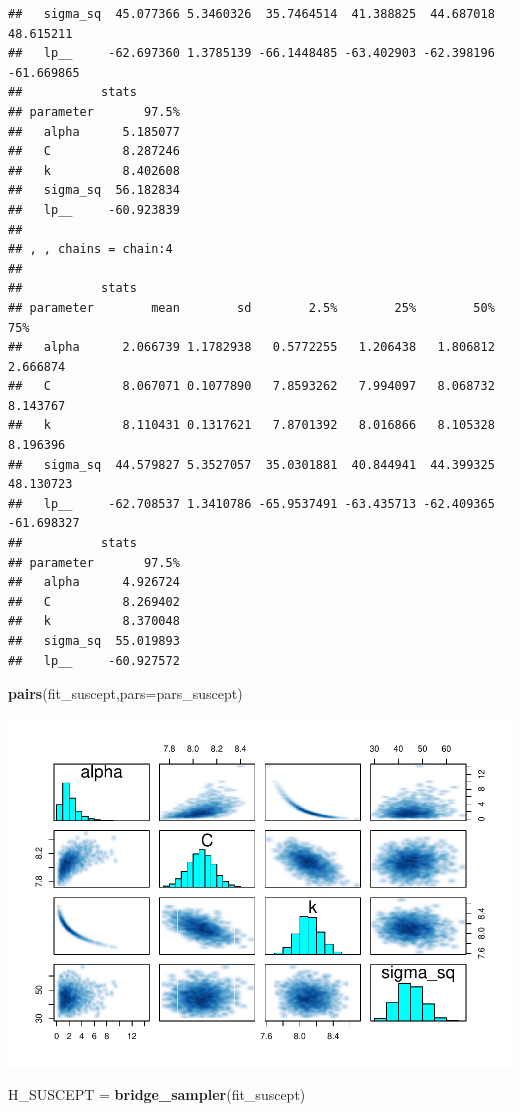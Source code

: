 \documentclass[
]{article}
\newenvironment{Shaded}{\begin{snugshade}}{\end{snugshade}}
\newcommand{\DataTypeTok}[1]{\textcolor[rgb]{0.13,0.29,0.53}{#1}}
\newcommand{\KeywordTok}[1]{\textcolor[rgb]{0.13,0.29,0.53}{\textbf{#1}}}
\newcommand{\NormalTok}[1]{#1}
\newcommand{\StringTok}[1]{\textcolor[rgb]{0.31,0.60,0.02}{#1}}
\begin{document}
\begin{verbatim}
##   sigma_sq  45.077366 5.3460326  35.7464514  41.388825  44.687018  48.615211
##   lp__     -62.697360 1.3785139 -66.1448485 -63.402903 -62.398196 -61.669865
##           stats
## parameter       97.5%
##   alpha      5.185077
##   C          8.287246
##   k          8.402608
##   sigma_sq  56.182834
##   lp__     -60.923839
## 
## , , chains = chain:4
## 
##           stats
## parameter        mean        sd        2.5%        25%        50%        75%
##   alpha      2.066739 1.1782938   0.5772255   1.206438   1.806812   2.666874
##   C          8.067071 0.1077890   7.8593262   7.994097   8.068732   8.143767
##   k          8.110431 0.1317621   7.8701392   8.016866   8.105328   8.196396
##   sigma_sq  44.579827 5.3527057  35.0301881  40.844941  44.399325  48.130723
##   lp__     -62.708537 1.3410786 -65.9537491 -63.435713 -62.409365 -61.698327
##           stats
## parameter       97.5%
##   alpha      4.926724
##   C          8.269402
##   k          8.370048
##   sigma_sq  55.019893
##   lp__     -60.927572
\end{verbatim}

\begin{Shaded}
\begin{Highlighting}[]
\KeywordTok{pairs}\NormalTok{(fit_suscept,}\DataTypeTok{pars=}\NormalTok{pars_suscept)}
\end{Highlighting}
\end{Shaded}

\includegraphics{multistep-model-comparison_files/figure-latex/model_susceptibility-1.pdf}

\begin{Shaded}
\begin{Highlighting}[]
\NormalTok{H_SUSCEPT =}\StringTok{ }\KeywordTok{bridge_sampler}\NormalTok{(fit_suscept)}
\end{Highlighting}
\end{Shaded}
\end{document}
